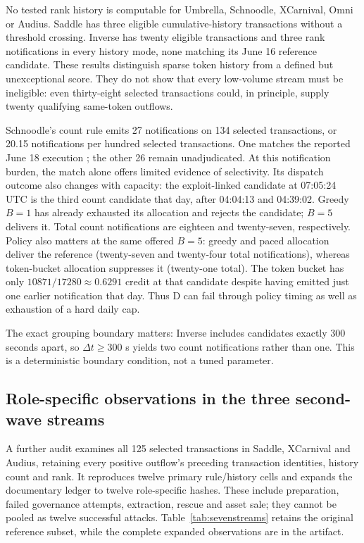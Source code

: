 \documentclass[preprint,12pt,authoryear]{elsarticle}
\begin{document}
No tested rank history is computable for Umbrella, Schnoodle, XCarnival, Omni or Audius. Saddle has three eligible cumulative-history transactions without a threshold crossing. Inverse has twenty eligible transactions and three rank notifications in every history mode, none matching its June 16 reference candidate. These results distinguish sparse token history from a defined but unexceptional score. They do not show that every low-volume stream must be ineligible: even thirty-eight selected transactions could, in principle, supply twenty qualifying same-token outflows.

Schnoodle's count rule emits 27 notifications on 134 selected transactions, or 20.15 notifications per hundred selected transactions. One matches the reported June 18 execution \citep{Schnoodle2022Analysis}; the other 26 remain unadjudicated. At this notification burden, the match alone offers limited evidence of selectivity. Its dispatch outcome also changes with capacity: the exploit-linked candidate at 07:05:24 UTC is the third count candidate that day, after 04:04:13 and 04:39:02. Greedy $B=1$ has already exhausted its allocation and rejects the candidate; $B=5$ delivers it. Total count notifications are eighteen and twenty-seven, respectively. Policy also matters at the same offered $B=5$: greedy and paced allocation deliver the reference (twenty-seven and twenty-four total notifications), whereas token-bucket allocation suppresses it (twenty-one total). The token bucket has only $10871/17280\approx0.6291$ credit at that candidate despite having emitted just one earlier notification that day. Thus D can fail through policy timing as well as exhaustion of a hard daily cap.

The exact grouping boundary matters: Inverse includes candidates exactly 300 seconds apart, so $\Delta t\geq300$ s yields two count notifications rather than one. This is a deterministic boundary condition, not a tuned parameter.

\subsection{Role-specific observations in the three second-wave streams}\label{sec:threeroles}
A further audit examines all 125 selected transactions in Saddle, XCarnival and Audius, retaining every positive outflow's preceding transaction identities, history count and rank. It reproduces twelve primary rule/history cells and expands the documentary ledger to twelve role-specific hashes. These include preparation, failed governance attempts, extraction, rescue and asset sale; they cannot be pooled as twelve successful attacks. Table~\ref{tab:sevenstreams} retains the original reference subset, while the complete expanded observations are in the artifact.
\end{document}
